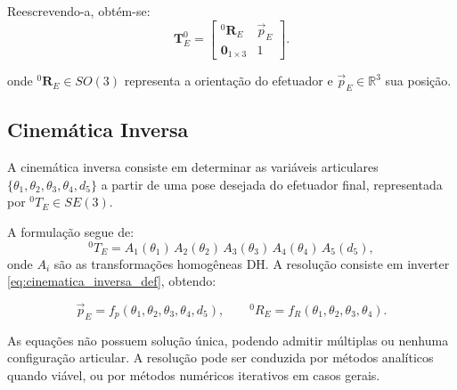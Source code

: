 Reescrevendo-a, obtém-se:
\begin{equation}
\mathbf{T}^{0}_{E} =
\begin{bmatrix}
{}^{0}\!\mathbf{R}_{E} & \vec{p}_E \\
\mathbf{0}_{1\times 3} & 1
\end{bmatrix}.
\end{equation}

onde ${}^0 \mathbf{R}_{E} \in SO(3)$ representa a orientação do efetuador e $\vec{p}_E \in \mathbb{R}^3$ sua posição.

\subsection{Cinemática Inversa}
\label{sec:cinematica_inversa}

A cinemática inversa consiste em determinar as variáveis articulares 
$\{ \theta_1, \theta_2, \theta_3, \theta_4, d_5 \}$ 
a partir de uma pose desejada do efetuador final, representada por ${}^0T_E \in SE(3)$. 

A formulação segue de:
\begin{equation}
{}^0 T_E = A_1(\theta_1)\,A_2(\theta_2)\,A_3(\theta_3)\,A_4(\theta_4)\,A_5(d_5),
\label{eq:cinematica_inversa_def}
\end{equation}
onde $A_i$ são as transformações homogêneas DH.
A resolução consiste em inverter \eqref{eq:cinematica_inversa_def}, obtendo:

\begin{equation}
\vec p_E = f_p(\theta_1,\theta_2,\theta_3,\theta_4,d_5), 
\qquad
{}^0R_E = f_R(\theta_1,\theta_2,\theta_3,\theta_4).
\end{equation}

As equações não possuem solução única, podendo admitir múltiplas ou nenhuma configuração articular. 
A resolução pode ser conduzida por métodos analíticos quando viável, ou por métodos numéricos iterativos em casos gerais.

